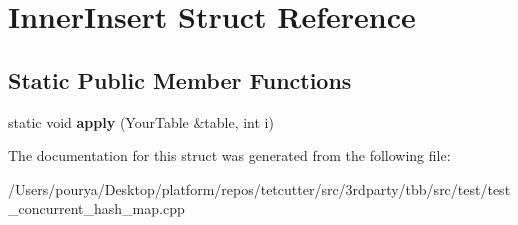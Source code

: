 \hypertarget{structInnerInsert}{}\section{Inner\+Insert Struct Reference}
\label{structInnerInsert}
\subsection*{Static Public Member Functions}
\begin{DoxyCompactItemize}
\item 
\hypertarget{structInnerInsert_a00c73f9352284c310aa07c00edf1b9de}{}static void {\bfseries apply} (Your\+Table \&table, int i)\label{structInnerInsert_a00c73f9352284c310aa07c00edf1b9de}

\end{DoxyCompactItemize}


The documentation for this struct was generated from the following file\+:\begin{DoxyCompactItemize}
\item 
/\+Users/pourya/\+Desktop/platform/repos/tetcutter/src/3rdparty/tbb/src/test/test\+\_\+concurrent\+\_\+hash\+\_\+map.\+cpp\end{DoxyCompactItemize}

